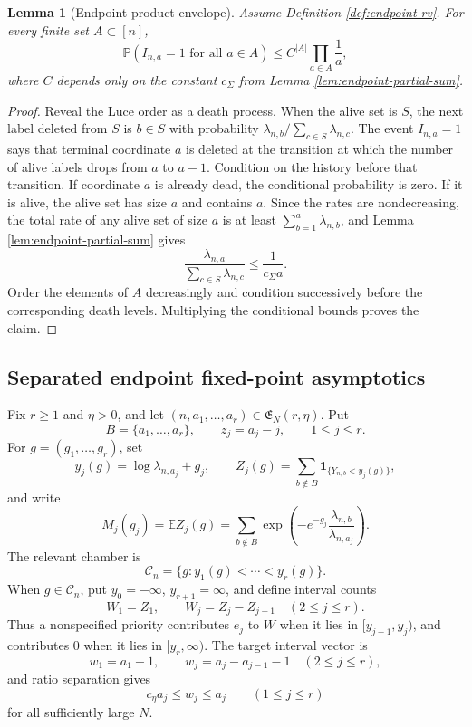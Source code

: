 \documentclass[11pt]{article}
\newtheorem{lemma}[theorem]{Lemma}
\theoremstyle{remark}
\newcommand{\Pp}{\mathbb P}
\newcommand{\Ee}{\mathbb E}
\newcommand{\one}{\mathbf 1}
\begin{document}
\begin{lemma}[Endpoint product envelope]\label{lem:endpoint-rv-product-bound}
Assume Definition \ref{def:endpoint-rv}.  For every finite set
\(A\subset[n]\),
\[
        \Pp(I_{n,a}=1\text{ for all }a\in A)
        \le C^{|A|}\prod_{a\in A}\frac1a,
\]
where $C$ depends only on the constant $c_\Sigma$ from Lemma \ref{lem:endpoint-partial-sum}.
\end{lemma}

\begin{proof}
Reveal the Luce order as a death process.  When the alive set is \(S\), the next
label deleted from \(S\) is \(b\in S\) with probability
\(\lambda_{n,b}/\sum_{c\in S}\lambda_{n,c}\).  The event \(I_{n,a}=1\) says that
terminal coordinate \(a\) is deleted at the transition at which the number of
alive labels drops from \(a\) to \(a-1\).  Condition on the history before that
transition.  If coordinate \(a\) is already dead, the conditional probability is
zero.  If it is alive, the alive set has size \(a\) and contains \(a\).  Since
the rates are nondecreasing, the total rate of any alive set of size \(a\) is at
least $\sum_{b=1}^a\lambda_{n,b}$, and Lemma \ref{lem:endpoint-partial-sum} gives
\[
        \frac{\lambda_{n,a}}{\sum_{c\in S}\lambda_{n,c}}
        \le \frac{1}{c_\Sigma a}.
\]
Order the elements of \(A\) decreasingly and condition successively before the
corresponding death levels.  Multiplying the conditional bounds proves the
claim.
\end{proof}


\subsection{Separated endpoint fixed-point asymptotics}
\label{subsec:endpoint-separated-fixed}

Fix \(r\ge1\) and \(\eta>0\), and let
\((n,a_1,\ldots,a_r)\in\mathfrak E_N(r,\eta)\).  Put
\[
        B=\{a_1,\ldots,a_r\},
        \qquad z_j=a_j-j,
        \qquad 1\le j\le r.
\]
For \(g=(g_1,\ldots,g_r)\), set
\[
        y_j(g)=\log\lambda_{n,a_j}+g_j,
        \qquad
        Z_j(g)=\sum_{b\notin B}
        \one_{\{Y_{n,b}<y_j(g)\}},
\]
and write
\[
        M_j(g_j)=\Ee Z_j(g)
        =\sum_{b\notin B}
        \exp\left(-e^{-g_j}
        \frac{\lambda_{n,b}}{\lambda_{n,a_j}}\right).
\]
The relevant chamber is
\[
        \mathscr C_n=\{g:y_1(g)<\cdots<y_r(g)\}.
\]
When \(g\in\mathscr C_n\), put \(y_0=-\infty\),
\(y_{r+1}=\infty\), and define interval counts
\[
        W_1=Z_1,
        \qquad W_j=Z_j-Z_{j-1}\quad(2\le j\le r).
\]
Thus a nonspecified priority contributes \(e_j\) to \(W\) when it lies in
\([y_{j-1},y_j)\), and contributes \(0\) when it lies in
\([y_r,\infty)\).  The target interval vector is
\[
        w_1=a_1-1,
        \qquad
        w_j=a_j-a_{j-1}-1\quad(2\le j\le r),
\]
and ratio separation gives
\[
        c_\eta a_j\le w_j\le a_j
        \qquad(1\le j\le r)
\tag{8.5}\label{eq:endpoint-interval-target-scale}
\]
for all sufficiently large \(N\).
\end{document}
